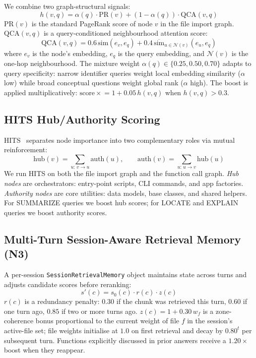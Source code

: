 \documentclass[runningheads]{llncs}
\begin{document}
We combine two graph-structural signals:
\begin{equation}
h(v,q) = \alpha(q)\cdot\text{PR}(v)
        +(1{-}\alpha(q))\cdot\text{QCA}(v,q)
\label{eq:hybrid}
\end{equation}
$\text{PR}(v)$ is the standard PageRank score of node $v$ in the
file import graph. $\text{QCA}(v,q)$ is a query-conditioned
neighbourhood attention score:
\[
\text{QCA}(v,q)
  = 0.6\,\text{sim}(e_v, e_q)
  + 0.4\,\textstyle\overline{\text{sim}}_{u\in\mathcal{N}(v)}(e_u, e_q)
\]
where $e_v$ is the node's embedding, $e_q$ is the query embedding,
and $\mathcal{N}(v)$ is the one-hop neighbourhood. The mixture
weight $\alpha(q)\in\{0.25, 0.50, 0.70\}$ adapts to query
specificity: narrow identifier queries weight local embedding
similarity ($\alpha$ low) while broad conceptual questions weight
global rank ($\alpha$ high). The boost is applied multiplicatively:
$\text{score} \mathrel{\times}= 1 + 0.05\,h(v,q)$ when
$h(v,q) > 0.3$.

\subsection{HITS Hub/Authority Scoring}

HITS~\cite{kleinberg1999hits} separates node importance into two
complementary roles via mutual reinforcement:
\begin{equation}
  \text{hub}(v)
    = \textstyle\sum_{u:\,v\to u}\text{auth}(u),\qquad
  \text{auth}(v)
    = \textstyle\sum_{u:\,u\to v}\text{hub}(u)
\label{eq:hits}
\end{equation}
We run HITS on both the file import graph and the function call
graph. \emph{Hub nodes} are orchestrators: entry-point scripts,
CLI commands, and app factories. \emph{Authority nodes} are core
utilities: data models, base classes, and shared helpers.
For SUMMARIZE queries we boost hub scores; for LOCATE and EXPLAIN
queries we boost authority scores.

\subsection{Multi-Turn Session-Aware Retrieval Memory (N3)}

A per-session \texttt{SessionRetrievalMemory} object maintains
state across turns and adjusts candidate scores before reranking:
\begin{equation}
s'(c) = s_0(c)\cdot r(c)\cdot z(c)
\label{eq:session}
\end{equation}
$r(c)$ is a redundancy penalty: $0.30$ if the chunk was retrieved
this turn, $0.60$ if one turn ago, $0.85$ if two or more turns ago.
$z(c) = 1 + 0.30\,w_f$ is a zone-coherence bonus proportional to
the current weight of file $f$ in the session's active-file set;
file weights initialise at $1.0$ on first retrieval and decay by
$0.80^t$ per subsequent turn. Functions explicitly discussed in
prior answers receive a $1.20\times$ boost when they reappear.
\end{document}
